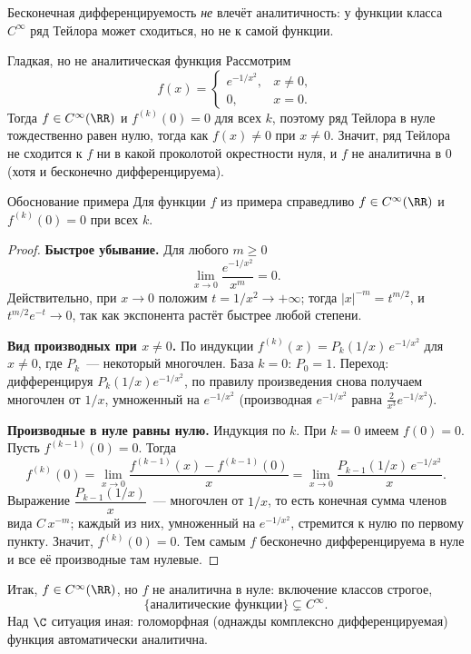 Бесконечная дифференцируемость \emph{не} влечёт аналитичность: у функции класса $C^\infty$ ряд Тейлора может сходиться, но не к самой функции.

\begin{Example}{Гладкая, но не аналитическая функция}{}
	Рассмотрим
	\[
	f(x) = \begin{cases} e^{-1/x^2}, & x \neq 0, \\ 0, & x = 0. \end{cases}
	\]
	Тогда $f \in C^\infty(\RR)$ и $f^{(k)}(0) = 0$ для всех $k$, поэтому ряд Тейлора в нуле тождественно равен нулю, тогда как $f(x) \neq 0$ при $x \neq 0$. Значит, ряд Тейлора не сходится к $f$ ни в какой проколотой окрестности нуля, и $f$ не аналитична в $0$ (хотя и бесконечно дифференцируема).
\end{Example}

\begin{Statement}{Обоснование примера}{}
	Для функции $f$ из примера справедливо $f \in C^\infty(\RR)$ и $f^{(k)}(0) = 0$ при всех $k$. 
\end{Statement}

\begin{proof}
	\textbf{Быстрое убывание.} Для любого $m \ge 0$
	\[
	\lim_{x \to 0} \frac{e^{-1/x^2}}{x^m} = 0.
	\]
	Действительно, при $x \to 0$ положим $t = 1/x^2 \to +\infty$; тогда $|x|^{-m} = t^{m/2}$, и $t^{m/2} e^{-t} \to 0$, так как экспонента растёт быстрее любой степени.

	\textbf{Вид производных при $x \neq 0$.} По индукции $f^{(k)}(x) = P_k(1/x)\,e^{-1/x^2}$ для $x \neq 0$, где $P_k$~--- некоторый многочлен. База $k = 0$: $P_0 = 1$. Переход: дифференцируя $P_k(1/x) e^{-1/x^2}$, по правилу произведения снова получаем многочлен от $1/x$, умноженный на $e^{-1/x^2}$ (производная $e^{-1/x^2}$ равна $\tfrac{2}{x^3} e^{-1/x^2}$).

	\textbf{Производные в нуле равны нулю.} Индукция по $k$. При $k = 0$ имеем $f(0) = 0$. Пусть $f^{(k-1)}(0) = 0$. Тогда
	\[
	f^{(k)}(0) = \lim_{x \to 0} \frac{f^{(k-1)}(x) - f^{(k-1)}(0)}{x} = \lim_{x \to 0} \frac{P_{k-1}(1/x)\,e^{-1/x^2}}{x}.
	\]
	Выражение $\dfrac{P_{k-1}(1/x)}{x}$~--- многочлен от $1/x$, то есть конечная сумма членов вида $C\,x^{-m}$; каждый из них, умноженный на $e^{-1/x^2}$, стремится к нулю по первому пункту. Значит, $f^{(k)}(0) = 0$. Тем самым $f$ бесконечно дифференцируема в нуле и все её производные там нулевые.
\end{proof}

\begin{Remark}{}{}
	Итак, $f \in C^\infty(\RR)$, но $f$ не аналитична в нуле: включение классов строгое,
	\[
	\{\text{аналитические функции}\} \subsetneq C^\infty.
	\]
	Над $\C$ ситуация иная: голоморфная (однажды комплексно дифференцируемая) функция автоматически аналитична.
\end{Remark}
